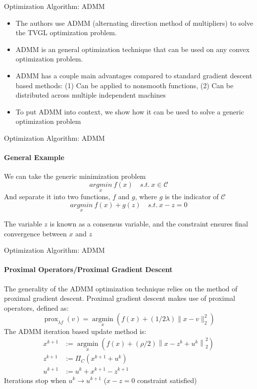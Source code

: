 \documentclass{beamer}
\begin{document}
\begin{frame}{Optimization Algorithm: ADMM}
	\begin{itemize}
		\item The authors use ADMM (alternating direction method of multipliers) to solve the TVGL optimization problem.
		\item ADMM is an general optimization technique that can be used on any convex optimization problem. 
		\item ADMM has a couple main advantages compared to standard gradient descent based methods: (1) Can be applied to nonsmooth functions, (2) Can be distributed across multiple independent machines
		\item To put ADMM into context, we show how it can be used to solve a generic optimization problem
	\end{itemize}
\end{frame}

\begin{frame}{Optimization Algorithm: ADMM}
\framesubtitle{General Example}
We can take the generic minimization problem
\[\underset{x}{argmin} \ f(x) \quad s.t. \ x \in \mathcal{C}\]
And separate it into two functions, $f$ and $g$, where $g$ is the indicator of $\mathcal{C}$
\[\underset{x}{argmin} \ f(x) + g(z) \quad s.t. \ x - z = 0\]
\begin{center} The variable $z$ is known as a consensus variable, and the constraint ensures final convergence between $x$ and $z$ \end{center}

\end{frame}

\begin{frame}{Optimization Algorithm: ADMM}
\framesubtitle{Proximal Operators/Proximal Gradient Descent}
The generality of the ADMM optimization technique relies on the method of proximal gradient descent. Proximal gradient descent makes use of proximal operators, defined as:
\[\operatorname{prox}_{\lambda f}(v)=\underset{x}{\operatorname{argmin}}\left(f(x)+(1 / 2 \lambda)\|x-v\|_{2}^{2}\right)\]
The ADMM iteration based update method is:
\begin{align} 
\nonumber x^{k+1} &:=\underset{x}{\operatorname{argmin}}\left(f(x)+(\rho / 2)\left\|x-z^{k}+u^{k}\right\|_{2}^{2}\right) 
\\ \nonumber z^{k+1} &:=\Pi_{C}\left(x^{k+1}+u^{k}\right) 
\\ \nonumber u^{k+1} &:=u^{k}+x^{k+1}-z^{k+1} 
\end{align}
Iterations stop when $u^{k} \xrightarrow{} u^{k+1}$ ($x-z = 0$ constraint satisfied)
\end{frame}
\end{document}
